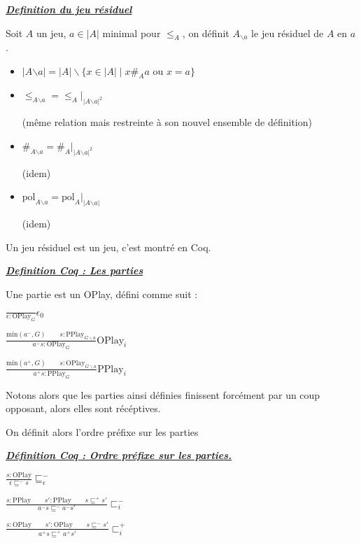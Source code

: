 \documentclass[a4paper,12ptCOUCOU
]{article}
\newlength{\mydepth}
\newlength{\myheight}
\newenvironment{answer}[1]
{\vspace{0.5cm}\begin{minipage}{\linewidth}\textbf{\textit{\underline{#1}}}\par\begin{lrbox}{\mybox}\quad\begin{minipage}{\linewidth}\color{black}\setlength{\parskip}{10pt}}
{\end{minipage}\end{lrbox}
\settodepth{\mydepth}{\usebox{\mybox}}
\settoheight{\myheight}{\usebox{\mybox}}
\addtolength{\myheight}{\mydepth}
\noindent\makebox[0pt]{
  \color{gray}\hspace{-0pt}\rule[-\mydepth]{1pt}{\myheight}}
\usebox{\mybox}
\end{minipage}
  }
\begin{document}
\begin{answer}{Definition du jeu résiduel}
Soit $A$ un jeu, $a \in |A|$ minimal pour $\leq_A$, on définit
$A_{\backslash a}$ le jeu résiduel de $A$ en $a$.

\begin{itemize}
\item $|A{\backslash a}| = |A| \backslash \{x \in |A| \mid x \#_A a \text{ ou } x=a\}$
\item $\leq_{A{\backslash a}} = \leq_A|_{|A{\backslash a}|^2}$

(même relation mais restreinte à son nouvel ensemble de définition)

\item $\#_{A{\backslash a}} = \#_A|_{|A{\backslash a}|^2}$

(idem)

\item $\text{pol}_{A{\backslash a}} = \text{pol}_A|_{|A{\backslash a}|}$


(idem)


\end{itemize}

\end{answer}

Un jeu résiduel est un jeu, c'est montré en Coq.

\begin{answer}{Definition Coq : Les parties}
Une partie est un OPlay, défini comme suit :

$\frac{}{\epsilon : \text{OPlay}_G}\epsilon_0$

$\frac{\text{min}(a^-,G) \qquad s : \text{PPlay}_{G\backslash a}}
{a^-s : \text{OPlay}_G}\text{OPlay}_i$

$\frac{\text{min}(a^+,G) \qquad s : \text{OPlay}_{G\backslash a}}
{a^+s : \text{PPlay}_G}\text{PPlay}_i$
\end{answer}

Notons alors que les parties ainsi définies finissent forcément par un coup
opposant, alors elles sont récéptives.


On définit alors l'ordre préfixe sur les parties

\begin{answer}{Définition Coq : Ordre préfixe sur les parties.}
$\frac{s : \text{OPlay}}{\epsilon \sqsubseteq^- s} \sqsubseteq^-_\epsilon$

$\frac{s : \text{PPlay} \qquad s' : \text{PPlay} \qquad s \sqsubseteq^+ s'}
{a^-s \sqsubseteq^- a^-s'} \sqsubset^-_i$

$\frac{s : \text{OPlay} \qquad s' : \text{OPlay} \qquad s \sqsubseteq^- s'}
{a^+s \sqsubseteq^+ a^+s'} \sqsubset^+_i$
\end{answer}
\end{document}
